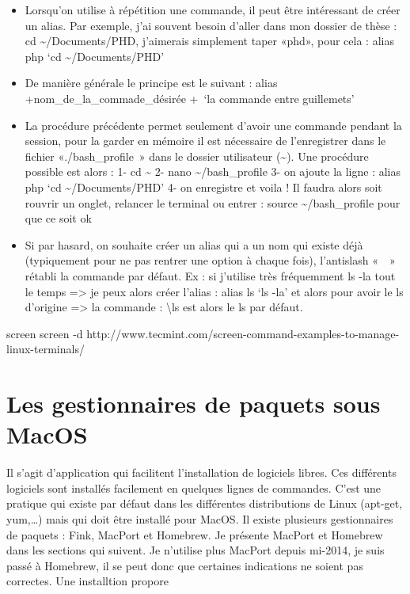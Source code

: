 \begin{itemize}
\tightlist
\item
  Lorsqu'on utilise à répétition une commande, il peut être intéressant
  de créer un alias. Par exemple, j'ai souvent besoin d'aller dans mon
  dossier de thèse : cd \textasciitilde{}/Documents/PHD, j'aimerais
  simplement taper «phd», pour cela : alias php `cd
  \textasciitilde{}/Documents/PHD'
\item
  De manière générale le principe est le suivant : alias
  +nom\_de\_la\_commade\_désirée +~`la commande entre guillemets'
\item
  La procédure précédente permet seulement d'avoir une commande pendant
  la session, pour la garder en mémoire il est nécessaire de
  l'enregistrer dans le fichier «./bash\_profile~» dans le dossier
  utilisateur (\textasciitilde{}). Une procédure possible est alors : 1-
  cd \textasciitilde{} 2- nano \textasciitilde{}/bash\_profile 3- on
  ajoute la ligne : alias php `cd \textasciitilde{}/Documents/PHD' 4- on
  enregistre et voila ! Il faudra alors soit rouvrir un onglet, relancer
  le terminal ou entrer : source \textasciitilde{}/bash\_profile pour
  que ce soit ok
\item
  Si par hasard, on souhaite créer un alias qui a un nom qui existe déjà
  (typiquement pour ne pas rentrer une option à chaque fois),
  l'antislash «~~» rétabli la commande par défaut. Ex : si j'utilise
  très fréquemment ls -la tout le temps =\textgreater{} je peux alors
  créer l'alias : alias ls `ls -la' et alors pour avoir le ls d'origine
  =\textgreater{} la commande : \textbackslash{}ls est alors le ls par
  défaut.
\end{itemize}

screen screen -d
http://www.tecmint.com/screen-command-examples-to-manage-linux-terminals/

\chapter{Les gestionnaires de paquets sous
MacOS}\label{les-gestionnaires-de-paquets-sous-macos}

Il s'agit d'application qui facilitent l'installation de logiciels
libres. Ces différents logiciels sont installés facilement en quelques
lignes de commandes. C'est une pratique qui existe par défaut dans les
différentes distributions de Linux (apt-get, yum,\ldots{}) mais qui doit
être installé pour MacOS. Il existe plusieurs gestionnaires de paquets :
Fink, MacPort et Homebrew. Je présente MacPort et Homebrew dans les
sections qui suivent. Je n'utilise plus MacPort depuis mi-2014, je suis
passé à Homebrew, il se peut donc que certaines indications ne soient
pas correctes. Une installtion propore

